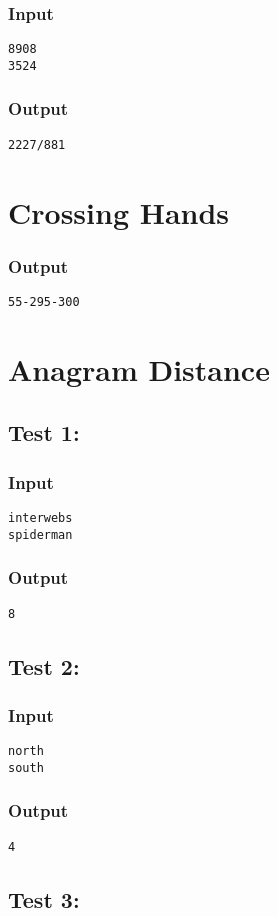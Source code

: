 \documentclass[twocolumn]{extarticle}
\begin{document}
\subsubsection*{Input}
\texttt{8908\\3524}

\subsubsection*{Output}
\texttt{2227/881}


\section{Crossing Hands}
\subsubsection*{Output}
\texttt{55-295-300}


\section{Anagram Distance}
\subsection*{Test 1:}
\subsubsection*{Input}
\texttt{interwebs\\
spiderman}

\subsubsection*{Output}
\texttt{8}

\subsection*{Test 2:}
\subsubsection*{Input}
\texttt{north\\
south}

\subsubsection*{Output}
\texttt{4}

\subsection*{Test 3:}
\end{document}
